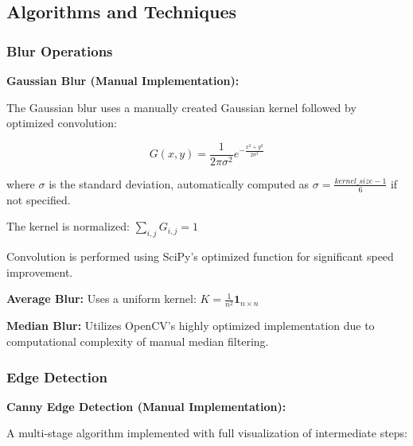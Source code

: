 \documentclass[12pt,a4paper]{article}
\begin{document}
\subsection{Algorithms and Techniques}

\subsubsection{Blur Operations}

\textbf{Gaussian Blur (Manual Implementation):}

The Gaussian blur uses a manually created Gaussian kernel followed by optimized convolution:

\begin{equation}
G(x, y) = \frac{1}{2\pi\sigma^2} e^{-\frac{x^2 + y^2}{2\sigma^2}}
\end{equation}

where $\sigma$ is the standard deviation, automatically computed as $\sigma = \frac{kernel\_size - 1}{6}$ if not specified.

The kernel is normalized: $\sum_{i,j} G_{i,j} = 1$

Convolution is performed using SciPy's optimized function for significant speed improvement.

\textbf{Average Blur:}
Uses a uniform kernel: $K = \frac{1}{n^2} \mathbf{1}_{n \times n}$

\textbf{Median Blur:}
Utilizes OpenCV's highly optimized implementation due to computational complexity of manual median filtering.

\subsubsection{Edge Detection}

\textbf{Canny Edge Detection (Manual Implementation):}

A multi-stage algorithm implemented with full visualization of intermediate steps:
\end{document}
